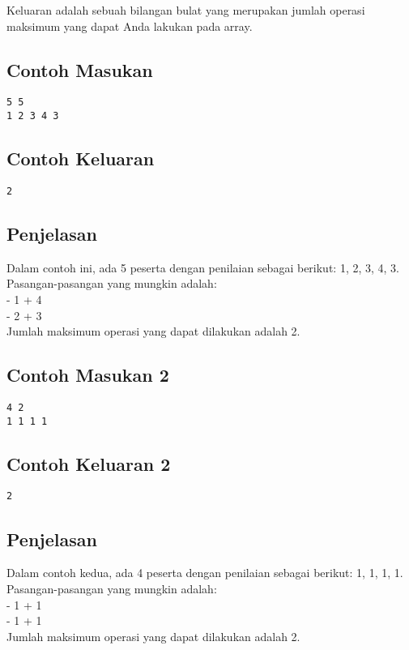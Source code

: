 \documentclass{article}
\begin{document}
Keluaran adalah sebuah bilangan bulat yang merupakan jumlah operasi maksimum yang dapat Anda lakukan pada array.

\begin{multicols}{2}
\subsection*{Contoh Masukan}
\begin{lstlisting}
5 5
1 2 3 4 3
\end{lstlisting}
\columnbreak
\subsection*{Contoh Keluaran}
\begin{lstlisting}
2
\end{lstlisting}
\end{multicols}

\subsection*{Penjelasan}

Dalam contoh ini, ada 5 peserta dengan penilaian sebagai berikut: 1, 2, 3, 4, 3. Pasangan-pasangan yang mungkin adalah:\\
- 1 + 4 \\
- 2 + 3 \\
Jumlah maksimum operasi yang dapat dilakukan adalah 2.

\begin{multicols}{2}
\subsection*{Contoh Masukan 2}
\begin{lstlisting}
4 2
1 1 1 1
\end{lstlisting}
\columnbreak
\subsection*{Contoh Keluaran 2}
\begin{lstlisting}
2
\end{lstlisting}
\end{multicols}

\subsection*{Penjelasan}

Dalam contoh kedua, ada 4 peserta dengan penilaian sebagai berikut: 1, 1, 1, 1. Pasangan-pasangan yang mungkin adalah:\\
- 1 + 1 \\
- 1 + 1 \\
Jumlah maksimum operasi yang dapat dilakukan adalah 2.
\end{document}
